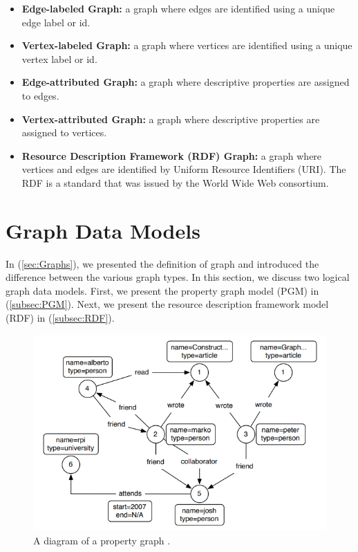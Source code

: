 {\begin{itemize}
\item \textbf{Edge-labeled Graph:} a graph where edges are identified using a unique edge label or id.

\item \textbf{Vertex-labeled Graph:} a graph where vertices are identified using a unique vertex label or id.

\item \textbf{Edge-attributed Graph:} a graph where descriptive properties are assigned to edges.

\item \textbf{Vertex-attributed Graph:} a graph where descriptive properties are assigned to vertices.

\item \textbf{Resource Description Framework (RDF) Graph:} a graph where vertices and edges are identified by Uniform Resource Identifiers (URI). The RDF is a standard that was issued by the World Wide Web consortium.

\end{itemize}


\section{Graph Data Models}
\label{sec:GraphModels}

In (\ref{sec:Graphs}), we presented the definition of graph and introduced the difference between the various graph types. In this section, we discuss two logical graph data models. First, we present the property graph model (PGM) in (\ref{subsec:PGM}). Next, we present the resource description framework model (RDF) in (\ref{subsec:RDF}).


\begin{figure}[H]
\centering
\includegraphics[width=17cm]{pics/PGM.png}
\caption{A diagram of a property graph \cite{DBLP:journals/corr/abs-1006-2361}.}
\label{fig:PGM}
\end{figure} 

}
